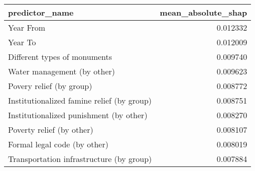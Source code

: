 \begin{tabular}{lr}
\toprule
predictor_name & mean_absolute_shap \\
\midrule
Year From & 0.012332 \\
Year To & 0.012009 \\
Different types of monuments & 0.009740 \\
Water management (by other) & 0.009623 \\
Povery relief (by group) & 0.008772 \\
Institutionalized famine relief (by group) & 0.008751 \\
Institutionalized punishment (by other) & 0.008270 \\
Poverty relief (by other) & 0.008107 \\
Formal legal code (by other) & 0.008019 \\
Transportation infrastructure (by group) & 0.007884 \\
\bottomrule
\end{tabular}
